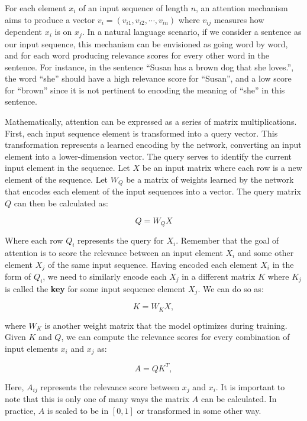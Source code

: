 For each element $x_i$ of an input sequence of length $n$, an attention mechanism aims to produce a vector $v_i = (v_{i1}, v_{i2}, \cdots, v_{in})$ where $v_{ij}$ measures how dependent $x_i$ is on $x_j$. In a natural language scenario, if we consider a sentence as our input sequence, this mechanism can be envisioned as going word by word, and for each word producing relevance scores for every other word in the sentence. For instance, in the sentence ``Susan has a brown dog that she loves.'', the word ``she'' should have a high relevance score for ``Susan'', and a low score for ``brown'' since it is not pertinent to encoding the meaning of ``she'' in this sentence.

Mathematically, attention can be expressed as a series of matrix multiplications. First, each input sequence element is transformed into a query vector. This transformation represents a learned encoding by the network, converting an input element into a lower-dimension vector. The query serves to identify the current input element in the sequence. Let $X$ be an input matrix where each row is a new element of the sequence. Let $W_Q$ be a matrix of weights learned by the network that encodes each element of the input sequences into a vector. The query matrix $Q$ can then be calculated as:

\begin{equation}
Q = W_Q X
\end{equation}

Where each row $Q_i$ represents the query for $X_i$. Remember that the goal of attention is to score the relevance between an input element $X_i$ and some other element $X_j$ of the same input sequence. Having encoded each element $X_i$ in the form of $Q_i$, we need to similarly encode each $X_j$ in a different matrix $K$ where $K_j$ is called the \textbf{key} for some input sequence element $X_j$. We can do so as:

\begin{equation}
K = W_K X,
\end{equation}

where $W_K$ is another weight matrix that the model optimizes during training. Given $K$ and $Q$, we can compute the relevance scores for every combination of input elements $x_i$ and $x_j$ as:

\begin{equation}
A = Q K^T,
\end{equation}

Here, $A_{ij}$ represents the relevance score between $x_j$ and $x_i$. It is important to note that this is only one of many ways the matrix $A$ can be calculated. In practice, $A$ is scaled to be in $[0, 1]$ or transformed in some other way.

